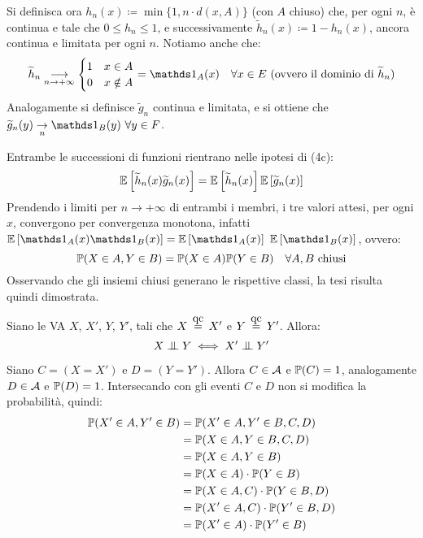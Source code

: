 \begin{dimo}
\begin{itemize}
      Si definisca ora $h_n(x) \coloneqq \min\{1,n \cdot d(x,A)\}$ (con $A$ chiuso) che, per ogni $n$, è continua e tale che $0 \leq h_n \leq 1$, e successivamente $\widetilde h_n(x) \coloneqq 1-h_n(x)$, ancora continua e limitata per ogni $n$. Notiamo anche che:
      $$\widetilde h_n \underset{n \to +\infty}{\longrightarrow} \begin{cases}
      1 & x\in A \\ 0 & x \notin A \end{cases} = \Ind_A(x) \quad \forall x \in E \text{ (ovvero il dominio di $\widetilde h_n$)}$$
      Analogamente si definisce $\widetilde g_n$ continua e limitata, e si ottiene che $\widetilde g_n(y)\underset{n}{\to}\Ind_{B\\}(y) \ \forall y \in F$.

      Entrambe le successioni di funzioni rientrano nelle ipotesi di (4c):
      $$\mathbb E \left[ \widetilde h_n(x)\widetilde g_n(x) \right]= \mathbb E \left[ \widetilde h_n(x) \right]\mathbb E \left[ \widetilde g_n(x) \right]$$
      Prendendo i limiti per $n \to +\infty$ di entrambi i membri, i tre valori attesi, per ogni $x$, convergono per convergenza monotona, infatti $\Ex{\Ind_{A\\}(x)\Ind_{B\\}(x)}= \Ex{\Ind_{A\\}(x)} \ \Ex{\Ind_{B\\}(x)}$, ovvero:
      $$\mathbb P(X \in A, Y \in B)=\mathbb P(X \in A)\mathbb P(Y \in B) \quad \forall A,B \text{ chiusi}$$
      Osservando che gli insiemi chiusi generano le rispettive classi, la tesi risulta quindi dimostrata. \qedhere
  \end{itemize}
\end{dimo}

\bigskip
\begin{prop}
  Siano le VA $X$, $X'$, $Y$, $Y'$, tali che $X \aceq X'$ e $Y \aceq Y'$. Allora:
  $$X \indep Y \iff X' \indep Y'$$
\end{prop}
\begin{dimo}\belowdisplayskip=-13pt
  Siano $C=(X=X')$ e $D=(Y=Y')$. Allora $C \in \mathcal A$ e $\mathbb P(C)=1$, analogamente $D \in \mathcal A$ e $\mathbb P(D)=1$. Intersecando con gli eventi $C$ e $D$ non si modifica la probabilità, quindi:
  \begin{align*}
    \mathbb P(X' \in A, Y' \in B)
    &= \mathbb P(X' \in A, Y' \in B, C, D)\\
    &= \mathbb P(X \in A, Y \in B, C, D) \\
    &= \mathbb P(X \in A, Y \in B)\\
    &= \mathbb P(X \in A) \cdot \mathbb P(Y \in B) \\
    &= \mathbb P(X \in A, C) \cdot \mathbb P(Y \in B,D)\\
    &= \mathbb P(X' \in A, C) \cdot \mathbb P(Y' \in B,D) \\
    &= \mathbb P(X' \in A) \cdot \mathbb P(Y' \in B)
  \end{align*}\qedhere
\end{dimo}

